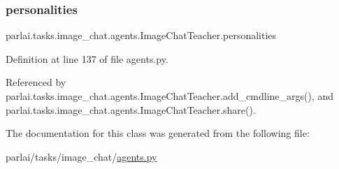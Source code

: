 \mbox{\label{classparlai_1_1tasks_1_1image__chat_1_1agents_1_1ImageChatTeacher_a3ba9be694ed33f16d9f3b4c6cc3f6a13}} 
\subsubsection{\texorpdfstring{personalities}{personalities}}
{\footnotesize\ttfamily parlai.\+tasks.\+image\+\_\+chat.\+agents.\+Image\+Chat\+Teacher.\+personalities}



Definition at line 137 of file agents.\+py.



Referenced by parlai.\+tasks.\+image\+\_\+chat.\+agents.\+Image\+Chat\+Teacher.\+add\+\_\+cmdline\+\_\+args(), and parlai.\+tasks.\+image\+\_\+chat.\+agents.\+Image\+Chat\+Teacher.\+share().



The documentation for this class was generated from the following file\+:\begin{DoxyCompactItemize}
\item 
parlai/tasks/image\+\_\+chat/\hyperlink{parlai_2tasks_2image__chat_2agents_8py}{agents.\+py}\end{DoxyCompactItemize}
